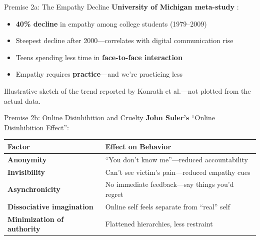 ﻿\documentclass[aspectratio=169,11pt]{beamer}
\begin{document}
\begin{frame}{Premise 2a: The Empathy Decline}
\textbf{University of Michigan meta-study} \parencite{konrath_empathy_decline}:

\begin{itemize}
    \item \textbf{40\% decline} in empathy among college students (1979--2009)
    \item Steepest decline after 2000---correlates with digital communication rise
    \item Teens spending less time in \textbf{face-to-face interaction}
    \item Empathy requires \textbf{practice}---and we're practicing less
\end{itemize}

\vspace{0.3cm}
\begin{center}

{\scriptsize Illustrative sketch of the trend reported by Konrath et al.---not plotted from the actual data.}
\end{center}
\end{frame}

\begin{frame}{Premise 2b: Online Disinhibition and Cruelty}
\textbf{John Suler's} ``Online Disinhibition Effect'':

\begin{table}[h]
\centering
\small
\begin{tabular}{>{\bfseries}l p{7cm}}
\toprule
Factor & Effect on Behavior \\
\midrule
Anonymity & ``You don't know me''---reduced accountability \\
Invisibility & Can't see victim's pain---reduced empathy cues \\
Asynchronicity & No immediate feedback---say things you'd regret \\
Dissociative imagination & Online self feels separate from ``real'' self \\
Minimization of authority & Flattened hierarchies, less restraint \\
\bottomrule
\end{tabular}
\end{table}
\end{frame}
\end{document}
